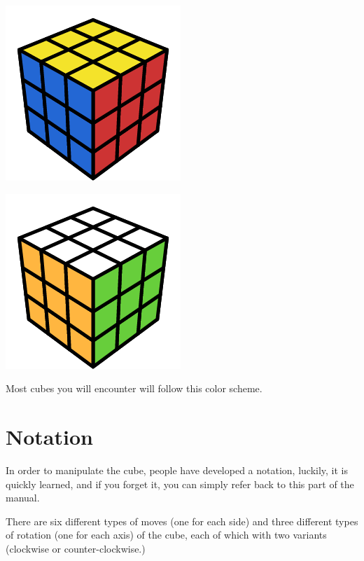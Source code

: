\documentclass[12pt,letterpaper]{article}
\begin{document}
\begin{multicols}{2}
    \begin{center}
	\includegraphics[scale=0.3]{cube_front}
    \end{center}

    \begin{center}
	\includegraphics[scale=0.3]{cube_back}
    \end{center}
\end{multicols}

Most cubes you will encounter will follow this color scheme.



\newpage

\section{Notation}

In order to manipulate the cube, people have developed a notation, luckily, it
is quickly learned, and if you forget it, you can simply refer back to this part
of the manual.

There are {\sc six} different types of moves (one for each side) and {\sc
three} different types of rotation (one for each axis) of the cube, each of
which with two variants (clockwise or counter-clockwise.)
\end{document}
